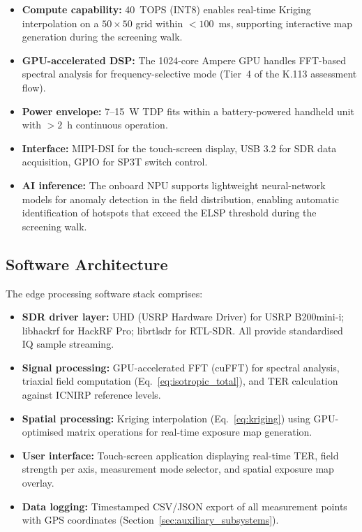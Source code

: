 \documentclass[11pt,a4paper]{article}
\begin{document}
\begin{itemize}
    \item \textbf{Compute capability:} 40~TOPS (INT8) enables real-time Kriging interpolation on a $50 \times 50$ grid within $< 100$~ms, supporting interactive map generation during the screening walk.
    \item \textbf{GPU-accelerated DSP:} The 1024-core Ampere GPU handles FFT-based spectral analysis for frequency-selective mode (Tier~4 of the K.113 assessment flow).
    \item \textbf{Power envelope:} 7--15~W TDP fits within a battery-powered handheld unit with $> 2$~h continuous operation.
    \item \textbf{Interface:} MIPI-DSI for the touch-screen display, USB 3.2 for SDR data acquisition, GPIO for SP3T switch control.
    \item \textbf{AI inference:} The onboard NPU supports lightweight neural-network models for anomaly detection in the field distribution, enabling automatic identification of hotspots that exceed the ELSP threshold during the screening walk.
\end{itemize}

\subsection{Software Architecture}

The edge processing software stack comprises:

\begin{itemize}
    \item \textbf{SDR driver layer:} UHD (USRP Hardware Driver) for USRP B200mini-i; libhackrf for HackRF Pro; librtlsdr for RTL-SDR. All provide standardised IQ sample streaming.
    \item \textbf{Signal processing:} GPU-accelerated FFT (cuFFT) for spectral analysis, triaxial field computation (Eq.~\ref{eq:isotropic_total}), and TER calculation against ICNIRP reference levels.
    \item \textbf{Spatial processing:} Kriging interpolation (Eq.~\ref{eq:kriging}) using GPU-optimised matrix operations for real-time exposure map generation.
    \item \textbf{User interface:} Touch-screen application displaying real-time TER, field strength per axis, measurement mode selector, and spatial exposure map overlay.
    \item \textbf{Data logging:} Timestamped CSV/JSON export of all measurement points with GPS coordinates (Section~\ref{sec:auxiliary_subsystems}).
\end{itemize}
\end{document}
